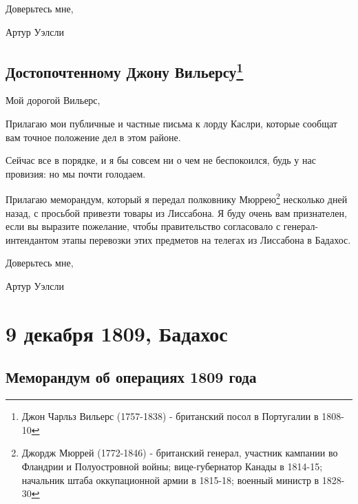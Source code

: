 \documentclass[
  oneside,
  12pt,
  titlepage]{book}
\begin{document}
Доверьтесь мне,

Артур Уэлсли

\hypertarget{ux434ux43eux441ux442ux43eux43fux43eux447ux442ux435ux43dux43dux43eux43cux443-ux434ux436ux43eux43dux443-ux432ux438ux43bux44cux435ux440ux441ux443}{%
\chapter[Достопочтенному Джону Вильерсу]{\texorpdfstring{Достопочтенному Джону Вильерсу\footnote{Джон Чарльз Вильерс (1757-1838) - британский посол в Португалии в 1808-10}}{Достопочтенному Джону Вильерсу}}\label{ux434ux43eux441ux442ux43eux43fux43eux447ux442ux435ux43dux43dux43eux43cux443-ux434ux436ux43eux43dux443-ux432ux438ux43bux44cux435ux440ux441ux443}}

Мой дорогой Вильерс,

Прилагаю мои публичные и частные письма к лорду Каслри, которые сообщат вам точное положение дел в этом районе.

Сейчас все в порядке, и я бы совсем ни о чем не беспокоился, будь у нас провизия: но мы почти голодаем.

Прилагаю меморандум, который я передал полковнику Мюррею\footnote{Джордж Мюррей (1772-1846) - британский генерал, участник кампании во Фландрии и Полуостровной войны; вице-губернатор Канады в 1814-15; начальник штаба оккупационной армии в 1815-18; военный министр в 1828-30} несколько дней назад, с просьбой привезти товары из Лиссабона. Я буду очень вам признателен, если вы выразите пожелание, чтобы правительство согласовало с генерал-интендантом этапы перевозки этих предметов на телегах из Лиссабона в Бадахос.

Доверьтесь мне,

Артур Уэлсли

\hypertarget{part-9-ux434ux435ux43aux430ux431ux440ux44f-1809-ux431ux430ux434ux430ux445ux43eux441}{%
\part*{9 декабря 1809, Бадахос}\label{part-9-ux434ux435ux43aux430ux431ux440ux44f-1809-ux431ux430ux434ux430ux445ux43eux441}}

\hypertarget{ux43cux435ux43cux43eux440ux430ux43dux434ux443ux43c-ux43eux431-ux43eux43fux435ux440ux430ux446ux438ux44fux445-1809-ux433ux43eux434ux430}{%
\chapter{Меморандум об операциях 1809 года}\label{ux43cux435ux43cux43eux440ux430ux43dux434ux443ux43c-ux43eux431-ux43eux43fux435ux440ux430ux446ux438ux44fux445-1809-ux433ux43eux434ux430}}
\end{document}
